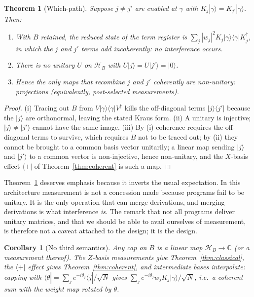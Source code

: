 \documentclass[11pt]{article}
\theoremstyle{definition}
\theoremstyle{plain}
\newtheorem{theorem}[definition]{Theorem}
\newtheorem{corollary}[definition]{Corollary}
\newcommand{\Hs}{\mathcal{H}}
\newcommand{\Hb}{\Hs_{B}}
\newcommand{\bra}[1]{\langle #1 |}
\newcommand{\ket}[1]{| #1 \rangle}
\newcommand{\ketbra}[2]{| #1 \rangle\langle #2 |}
\begin{document}
\begin{theorem}[Which-path]\label{thm:whichpath}
Suppose $j \neq j'$ are enabled at $\gamma$ with $K_j\ket{\gamma} = K_{j'}\ket{\gamma}$. Then:
\begin{enumerate}[leftmargin=*,label=(\roman*)]
  \item With $B$ retained, the reduced state of the term register is
        $\sum_j |w_j|^2 K_j\ketbra{\gamma}{\gamma}K_j^\dagger$, in which the $j$ and $j'$ terms
        add incoherently: no interference occurs.
  \item There is no unitary $U$ on $\Hb$ with $U\ket{j} = U\ket{j'} = \ket{0}$.
  \item Hence the only maps that recombine $j$ and $j'$ coherently are non-unitary: projections
        (equivalently, post-selected measurements).
\end{enumerate}
\end{theorem}

\begin{proof}
(i) Tracing out $B$ from $V\ketbra{\gamma}{\gamma}V^\dagger$ kills the off-diagonal terms
$\ketbra{j}{j'}$ because the $\ket{j}$ are orthonormal, leaving the stated Kraus form.
(ii) A unitary is injective; $\ket{j}\neq\ket{j'}$ cannot have the same image.
(iii) By (i) coherence requires the off-diagonal terms to survive, which requires $B$ not to be
traced out; by (ii) they cannot be brought to a common basis vector unitarily; a linear map
sending $\ket{j}$ and $\ket{j'}$ to a common vector is non-injective, hence non-unitary, and the
$X$-basis effect $\bra{+}$ of Theorem~\ref{thm:coherent} is such a map.
\end{proof}

Theorem~\ref{thm:whichpath} deserves emphasis because it inverts the usual expectation. In this
architecture measurement is not a concession made because programs fail to be unitary. It is the
only operation that can merge derivations, and merging derivations is what interference
\emph{is}. The remark that not all programs deliver unitary matrices, and that we should be able
to avail ourselves of measurement, is therefore not a caveat attached to the design; it is the
design.

\begin{corollary}[No third semantics]\label{cor:nothird}
Any cap on $B$ is a linear map $\Hb\to\mathbb{C}$ (or a measurement thereof). The $Z$-basis
measurements give Theorem~\ref{thm:classical}, the $\bra{+}$ effect gives
Theorem~\ref{thm:coherent}, and intermediate bases interpolate: capping with
$\bra{\theta} = \sum_j e^{-i\theta_j}\bra{j}/\sqrt{N}$ gives
$\sum_j e^{-i\theta_j}w_jK_j\ket{\gamma}/\sqrt{N}$, i.e.\ a coherent sum with the weight map
rotated by $\theta$.
\end{corollary}
\end{document}
